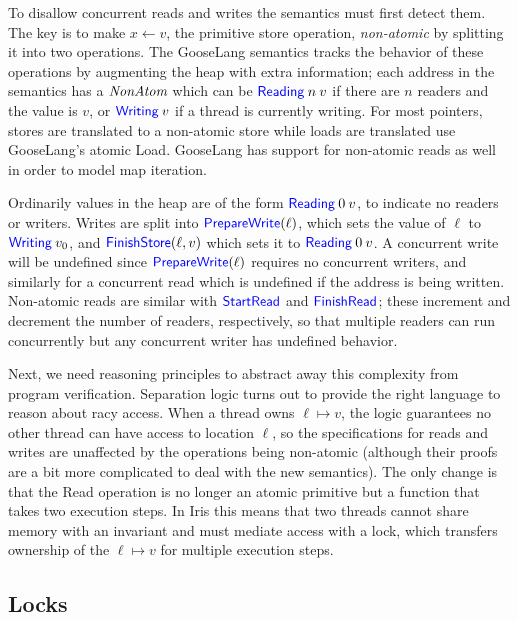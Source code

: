 To disallow concurrent reads and writes the semantics must first detect them. The key is to make
$x \gets v$, the primitive store operation, \emph{non-atomic} by splitting it
into two operations. The GooseLang semantics tracks the behavior of these
operations by augmenting the heap with extra information; each address in the
semantics has a $\textit{NonAtom}$ which can be
$\mathsf{\textcolor{blue}{Reading}} \: n \: v$ if there are $n$ readers and the value is $v$,
or $\mathsf{\textcolor{blue}{Writing}} \: v$ if a thread is currently writing. For most
pointers, stores are translated to a non-atomic store while loads are translated
use GooseLang's atomic Load. GooseLang has support for non-atomic
reads as well in order to model map iteration.

Ordinarily values in the heap are of the form $\mathsf{\textcolor{blue}{Reading}} \: 0 \: v$,
to indicate no readers or writers. Writes are split into
$\mathsf{\textcolor{blue}{PrepareWrite}}(\ell)$, which sets the value of $\ell$ to
$\mathsf{\textcolor{blue}{Writing}} \: v_{0}$, and $\mathsf{\textcolor{blue}{FinishStore}}(\ell, v)$ which sets
it to $\mathsf{\textcolor{blue}{Reading}} \: 0 \: v$. A concurrent write will be undefined
since $\mathsf{\textcolor{blue}{PrepareWrite}}(\ell)$ requires no concurrent writers, and
similarly for a concurrent read which is undefined if the address is being
written. Non-atomic reads are similar with $\mathsf{\textcolor{blue}{StartRead}}$ and
$\mathsf{\textcolor{blue}{FinishRead}}$; these increment and decrement the number of readers,
respectively, so that multiple readers can run concurrently but any concurrent
writer has undefined behavior.

Next, we need reasoning principles to abstract away this complexity from
program verification. Separation logic turns out to provide the right
language to reason about racy access. When a thread owns
$\ell \mapsto v$, the logic guarantees no other thread can have access to location
$\ell$, so the specifications for reads and writes are unaffected by the
operations being non-atomic (although their proofs are a bit more
complicated to deal with the new semantics). The only change is that the
Read operation is no longer an atomic primitive but a function that
takes two execution steps. In Iris this means that two threads cannot
share memory with an invariant and must mediate access with a lock,
which transfers ownership of the $\ell \mapsto v$ for multiple execution
steps.

\subsection{Locks}

